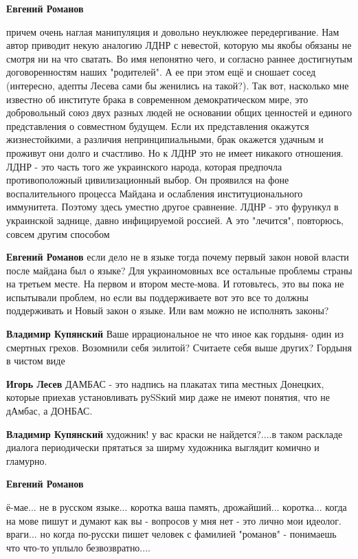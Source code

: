 \begin{itemize}
\begin{itemize}
\textbf{Евгений Романов} 

причем очень наглая манипуляция и довольно неуклюжее передергивание. Нам автор
приводит некую аналогию ЛДНР с невестой, которую мы якобы обязаны не смотря ни
на что сватать. Во имя непонятно чего, и согласно раннее достигнутым
договоренностям наших "родителей". А ее при этом ещё и сношает сосед
(интересно, адепты Лесева сами бы женились на такой?). Так вот, насколько мне
известно об институте брака в современном демократическом мире, это
добровольный союз двух разных людей не основании общих ценностей и единого
представления о совместном будущем. Если их представления окажутся
жизнестойкими, а различия непринципиальными, брак окажется удачным и проживут
они долго и счастливо. Но к ЛДНР это не имеет никакого отношения. ЛДНР - это
часть того же украинского народа, которая предпочла противоположный
цивилизационный выбор. Он проявился на фоне воспалительного процесса Майдана и
ослабления институционального иммунитета. Поэтому здесь уместно другое
сравнение. ЛДНР - это фурункул в украинской заднице, давно инфицируемой
россией. А это "лечится", повторюсь, совсем другим способом

\textbf{Евгений Романов} если дело не в языке тогда почему первый закон новой власти после майдана был о языке? Для украиномовных все остальные проблемы страны на третьем месте. На первом и втором месте-мова. И готовьтесь, это вы пока не испытывали проблем, но если вы поддерживаете вот это все то должны поддерживать и Новый закон о языке. Или вам можно не исполнять законы?

\textbf{Владимир Купянский} Ваше иррациональное не что иное как гордыня- один из смертных грехов. Возомнили себя эилитой? Считаете себя выше других? Гордыня в чистом виде

\textbf{Игорь Лесев} ДАМБАС - это надпись на плакатах типа местных Донецких, которые приехав установливать руSSкий мир даже не имеют понятия, что не дАмбас, а ДОНБАС.

\textbf{Владимир Купянский} художник! у вас краски не найдется?....в таком раскладе диалога периодически прятаться за ширму художника выглядит комично и гламурно.

\textbf{Евгений Романов} 

ё-мае... не в русском языке... коротка ваша память, дрожайший... коротка...
когда на мове пишут и думают как вы - вопросов у мня нет - это лично мои
идеолог. враги... но когда по-русски пишет человек с фамилией "романов" -
понимаешь что что-то уплыло безвозвратно....


\end{itemize}
\end{itemize}
